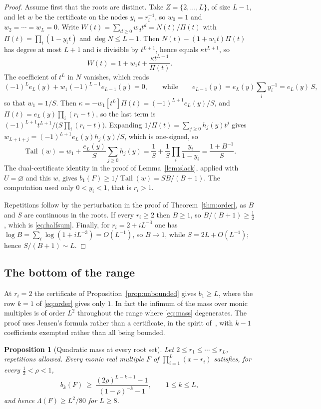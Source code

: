 \documentclass[11pt]{article}
\newtheorem{proposition}[theorem]{Proposition}
\DeclareMathOperator{\Tail}{Tail}
\begin{document}
\begin{proof}
Assume first that the roots are distinct.  Take $Z=\{2,\ldots,L\}$, of size
$L-1$, and let $w$ be the certificate on the
nodes $y_i=r_i^{-1}$, so $w_0=1$ and $w_2=\cdots=w_L=0$.  Write
$W(t)=\sum_{d\ge0}w_dt^d=N(t)/\Pi(t)$ with $\Pi(t)=\prod_i(1-y_it)$ and
$\deg N\le L-1$.  Then $N(t)-(1+w_1t)\Pi(t)$ has degree at most $L+1$ and is
divisible by $t^{L+1}$, hence equals $\kappa t^{L+1}$, so
\[
  W(t)=1+w_1t+\frac{\kappa t^{L+1}}{\Pi(t)} .
\]
The coefficient of $t^L$ in $N$ vanishes, which reads
\[
  (-1)^Le_L(y)+w_1(-1)^{L-1}e_{L-1}(y)=0,
  \qquad\text{while}\qquad
  e_{L-1}(y)=e_L(y)\sum_{i}y_i^{-1}=e_L(y)\,S,
\]
so that $w_1=1/S$.  Then
$\kappa=-w_1[t^L]\Pi(t)=(-1)^{L+1}e_L(y)/S$, and $\Pi(t)=e_L(y)\prod_i(r_i-t)$,
so the last term is $(-1)^{L+1}t^{L+1}/\bigl(S\prod_i(r_i-t)\bigr)$.
Expanding $1/\Pi(t)=\sum_{j\ge0}h_j(y)t^j$ gives
$w_{L+1+j}=(-1)^{L+1}e_L(y)h_j(y)/S$, which is one-signed, so
\[
  \Tail(w)=w_1+\frac{e_L(y)}S\sum_{j\ge0}h_j(y)
  =\frac1S+\frac1S\prod_{i}\frac{y_i}{1-y_i}
  =\frac{1+B^{-1}}S .
\]
The dual-certificate identity in the proof of Lemma~\ref{lem:slack}, applied
with $U=\varnothing$ and this $w$, gives $b_1(F)\ge1/\Tail(w)=SB/(B+1)$.  The
computation used only $0<y_i<1$, that is $r_i>1$.

Repetitions follow by the perturbation in the proof of
Theorem~\ref{thm:order}, as $B$ and $S$ are continuous in the roots.  If
every $r_i\ge2$ then $B\ge1$, so $B/(B+1)\ge\tfrac12$, which is
\eqref{eq:halfsum}.  Finally, for $r_i=2+iL^{-3}$ one has
$\log B=\sum_i\log(1+iL^{-3})=O(L^{-1})$, so $B\to1$, while
$S=2L+O(L^{-1})$; hence $S/(B+1)\sim L$.
\end{proof}

\subsection{The bottom of the range}\label{sec:bottom}

At $r_i=2$ the certificate of Proposition~\ref{prop:unbounded} gives
$b_1\ge L$, where the row $k=1$ of \eqref{eq:order} gives only $1$.  In fact
the infimum of the mass over monic multiples is of order $L^2$
throughout the range where \eqref{eq:mass} degenerates.  The proof uses
Jensen's formula rather than a certificate, in the spirit
of~\cite{bbbp-multiple,bbbp-ray}, with $k-1$ coefficients exempted rather
than all being bounded.

\begin{proposition}[Quadratic mass at every root set]
\label{prop:quadratic}
Let $2\le r_1\le\cdots\le r_L$, repetitions allowed.  Every monic real
multiple $F$ of $\prod_{i=1}^L(x-r_i)$ satisfies, for every
$\tfrac12<\rho<1$,
\begin{equation}\label{eq:jensen}
  b_k(F)\ \ge\ \frac{(2\rho)^{L-k+1}-1}{(1-\rho)^{-k}-1},\qquad 1\le k\le L,
\end{equation}
and hence $\Lambda(F)\ge L^2/80$ for $L\ge8$.
\end{proposition}
\end{document}
